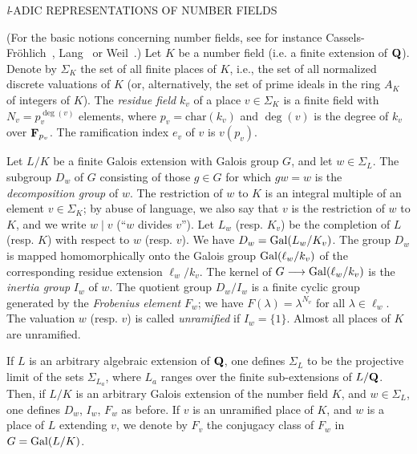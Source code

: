 
%
  {\textit{l}-ADIC REPRESENTATIONS OF NUMBER FIELDS}


(For the basic notions concerning number fields, see for instance
Cassels-Fr\"ohlich~\cite{cassels-frohlich}, Lang~\cite{lang-algnum} or
Weil~\cite{weil-bnt}.)  Let $K$ be a number field (i.e. a finite
extension of $\mathbf{Q}$).  Denote by $\Sigma_K$ the set of all finite places
of $K$, i.e., the set of all normalized discrete valuations of $K$
(or, alternatively, the set of prime ideals in the ring $A_K$ of
integers of $K$).  The \emph{residue field} $k_v$ of a place
$v \in \Sigma_K$ is a finite field with $N_v = p_v^{\deg(v)}$
elements, where $p_v = \mathrm{char}(k_v)$ and $\deg(v)$ is the degree
of $k_v$ over $\mathbf{F}_{p_v}$.  The ramification index $e_v$ of $v$ is
$v(p_v)$.

Let $L/K$ be a finite Galois extension with Galois group $G$, and let
$w \in \Sigma_L$.  The subgroup $D_w$ of $G$ consisting of those
$g \in G$ for which $gw = w$ is the \emph{decomposition group} of $w$.
The restriction of $w$ to $K$ is an integral multiple of an element
$v \in \Sigma_K$; by abuse of language, we also say that $v$ is the
restriction of $w$ to $K$, and we write $w \mid v$ (``$w$ divides
$v$'').  Let $L_w$ (resp. $K_v$) be the completion of $L$ (resp. $K$)
with respect to $w$ (resp. $v$).  We have $D_w = \mathrm{Gal}(L_w/K_v)$.  The
group $D_w$ is mapped homomorphically onto the Galois group
$\mathrm{Gal}(\ell_w/k_v)$ of the corresponding residue extension
$\ell_w/k_v$.  The kernel of $G \longrightarrow \mathrm{Gal}(\ell_w/k_v)$ is
the \emph{inertia group} $I_w$ of $w$.
The quotient group $D_w/I_w$ is a finite cyclic group generated by the
\emph{Frobenius element} $F_w$; we have $F(\lambda) = \lambda^{N_v}$
for all $\lambda \in \ell_w$.  The valuation $w$ (resp. $v$) is called
\emph{unramified} if $I_w = \{1\}$.  Almost all places of $K$ are
unramified.

If $L$ is an arbitrary algebraic extension of $\mathbf{Q}$, one defines
$\Sigma_L$ to be the projective limit of the sets $\Sigma_{L_a}$, where
$L_a$ ranges over the finite sub-extensions of $L/\mathbf{Q}$.  Then, if $L/K$
is an arbitrary Galois extension of the number field $K$, and
$w \in \Sigma_L$, one defines $D_w$, $I_w$, $F_w$ as before.  If $v$
is an unramified place of $K$, and $w$ is a place of $L$ extending
$v$, we denote by $F_v$ the conjugacy class of $F_w$ in
$G = \mathrm{Gal}(L/K)$.

